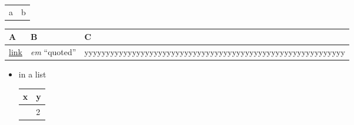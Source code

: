 {\def\LTcaptype{none} %
\begin{longtable}[]{@{}ll@{}}
\toprule\noalign{}
\endhead
\bottomrule\noalign{}
\endlastfoot
a & b \\
\end{longtable}
}

{\def\LTcaptype{none} %
\begin{longtable}[]{@{}
  >{\raggedright\arraybackslash}p{}
  >{\centering\arraybackslash}p{}
  >{\raggedleft\arraybackslash}p{}@{}}
\toprule\noalign{}
\begin{minipage}[b]{\linewidth}\raggedright
A
\end{minipage} & \begin{minipage}[b]{\linewidth}\centering
B
\end{minipage} & \begin{minipage}[b]{\linewidth}\raggedleft
C
\end{minipage} \\
\midrule\noalign{}
\endhead
\bottomrule\noalign{}
\endlastfoot
\href{http://example.com}{link} & \emph{em} ``quoted'' &
yyyyyyyyyyyyyyyyyyyyyyyyyyyyyyyyyyyyyyyyyyyyyyyyyyyyyyyyyyyy \\
\end{longtable}
}

\begin{itemize}
\item
  in a list

  {\def\LTcaptype{none} %
  \begin{longtable}[]{@{}ll@{}}
  \toprule\noalign{}
  x & y \\
  \midrule\noalign{}
  \endhead
  \bottomrule\noalign{}
  \endlastfoot
  1 & 2 \\
  \end{longtable}
  }
\end{itemize}
